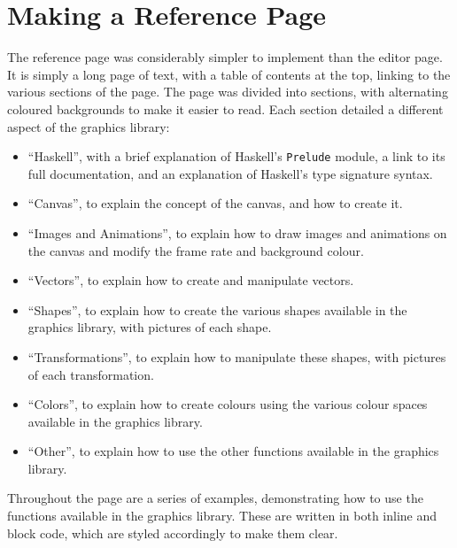 \documentclass[../main.tex]{subfiles}
\begin{document}
    \section{Making a Reference Page}
        The reference page was considerably simpler to implement than the editor page.
        It is simply a long page of text, with a table of contents at the top, linking
            to the various sections of the page.
        The page was divided into sections, with alternating coloured backgrounds to
            make it easier to read.
        Each section detailed a different aspect of the graphics library:
        \begin{itemize}
            \item ``Haskell'', with a brief explanation of Haskell's \texttt{Prelude} module,
                  a link to its full documentation, and an explanation of Haskell's type
                  signature syntax.
            \item ``Canvas'', to explain the concept of the canvas, and how to create it.
            \item ``Images and Animations'', to explain how to draw images and animations on the
                  canvas and modify the frame rate and background colour.
            \item ``Vectors'', to explain how to create and manipulate vectors.
            \item ``Shapes'', to explain how to create the various shapes available in the
                  graphics library, with pictures of each shape.
            \item ``Transformations'', to explain how to manipulate these shapes, with pictures
                  of each transformation.
            \item ``Colors'', to explain how to create colours using the various colour spaces
                  available in the graphics library.
            \item ``Other'', to explain how to use the other functions available in the graphics
                  library.
        \end{itemize}

        Throughout the page are a series of examples, demonstrating how to use the
            functions available in the graphics library.
        These are written in both inline and block code, which are styled accordingly
            to make them clear.
\end{document}
